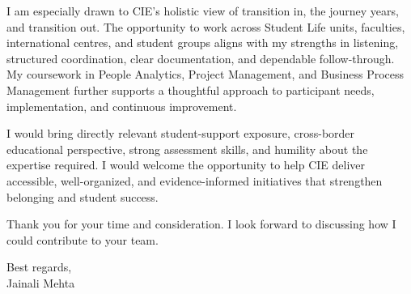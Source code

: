 \documentclass[letterpaper,10pt]{article}
\begin{document}
I am especially drawn to CIE's holistic view of transition in, the journey years, and transition out. The opportunity to work across Student Life units, faculties, international centres, and student groups aligns with my strengths in listening, structured coordination, clear documentation, and dependable follow-through. My coursework in People Analytics, Project Management, and Business Process Management further supports a thoughtful approach to participant needs, implementation, and continuous improvement.

I would bring directly relevant student-support exposure, cross-border educational perspective, strong assessment skills, and humility about the expertise required. I would welcome the opportunity to help CIE deliver accessible, well-organized, and evidence-informed initiatives that strengthen belonging and student success.

Thank you for your time and consideration. I look forward to discussing how I could contribute to your team.

Best regards,\\[8pt]
Jainali Mehta
\end{document}
